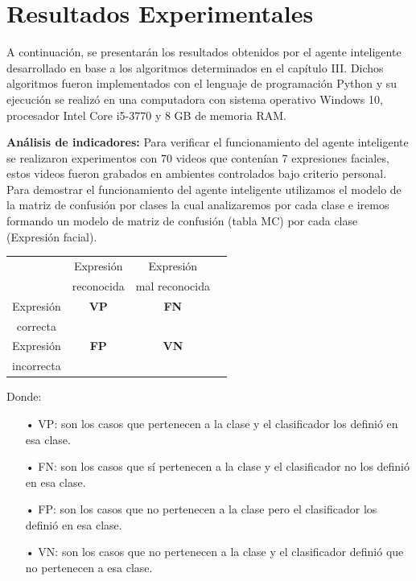 \vskip 7cm

\section{Resultados Experimentales}

A continuación, se presentarán los resultados obtenidos por el agente inteligente desarrollado en base a los algoritmos determinados en el capítulo III. Dichos algoritmos fueron implementados con el lenguaje de programación Python y su ejecución se realizó en una computadora con sistema operativo Windows 10, procesador Intel Core i5-3770 y 8 GB de memoria RAM. \vskip 0.1cm

{\bf Análisis de indicadores:} \vskip 0.1cm
Para verificar el funcionamiento del agente inteligente se realizaron experimentos con 70 videos que contenían 7 expresiones faciales, estos videos fueron grabados en ambientes controlados bajo criterio personal.
\vskip 0.1cm
Para demostrar el funcionamiento del agente inteligente utilizamos el modelo de la matriz de confusión por clases la cual analizaremos por cada clase e iremos formando un modelo de matriz de confusión (tabla MC) por cada clase (Expresión facial).

\begin{table}[ht!]
\centering
\begin{tabular}{|c|c|c|c|} \hline
 & Expresión \par & Expresión \par \\
& reconocida & mal reconocida\\ \hline
Expresión \par & \bf VP & \bf FN \\ 
correcta & & \\ \hline 
Expresión \par & \bf FP & \bf VN \\ 
incorrecta & & \\ \hline 
\end{tabular}
\end{table}

Donde: \vskip 0.1cm

\begin{itemize}
\item[•] VP: son los casos que pertenecen a la clase y el clasificador los definió en esa clase. 
\item[•] FN: son los casos que sí pertenecen a la clase y el clasificador no los definió en esa clase. 
\item[•] FP: son los casos que no pertenecen a la clase pero el clasificador los definió en esa clase. 
\item[•] VN: son los casos que no pertenecen a la clase y el clasificador definió que no pertenecen a esa clase.
\end{itemize}

